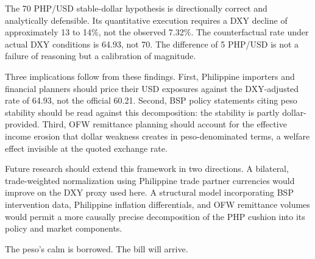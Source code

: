 \documentclass[12pt]{article}
\begin{document}
The 70 PHP/USD stable-dollar hypothesis is directionally correct and analytically
defensible. Its quantitative execution requires a DXY decline of approximately 13
to 14\%, not the observed 7.32\%. The counterfactual rate under actual DXY conditions
is 64.93, not 70. The difference of 5 PHP/USD is not a failure of reasoning but a
calibration of magnitude.

Three implications follow from these findings. First, Philippine importers and
financial planners should price their USD exposures against the DXY-adjusted rate
of 64.93, not the official 60.21. Second, BSP policy statements citing peso stability
should be read against this decomposition: the stability is partly dollar-provided.
Third, OFW remittance planning should account for the effective income erosion that
dollar weakness creates in peso-denominated terms, a welfare effect invisible at the
quoted exchange rate.

Future research should extend this framework in two directions. A bilateral,
trade-weighted normalization using Philippine trade partner currencies would improve
on the DXY proxy used here. A structural model incorporating BSP intervention data,
Philippine inflation differentials, and OFW remittance volumes would permit a more
causally precise decomposition of the PHP cushion into its policy and market
components.

The peso's calm is borrowed. The bill will arrive.

\newpage
\printbibliography[title={References}]
\end{document}
